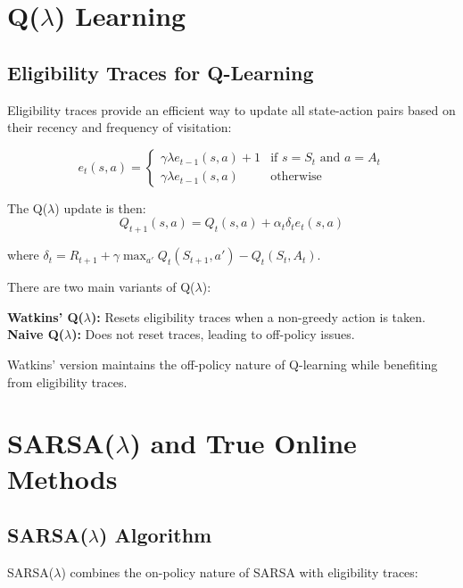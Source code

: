 \section{Q($\lambda$) Learning}

\subsection{Eligibility Traces for Q-Learning}

Eligibility traces provide an efficient way to update all state-action pairs based on their recency and frequency of visitation:

\begin{equation}
e_t(s,a) = \begin{cases}
\gamma \lambda e_{t-1}(s,a) + 1 & \text{if } s = S_t \text{ and } a = A_t \\
\gamma \lambda e_{t-1}(s,a) & \text{otherwise}
\end{cases}
\end{equation}

The Q($\lambda$) update is then:
\begin{equation}
Q_{t+1}(s,a) = Q_t(s,a) + \alpha_t \delta_t e_t(s,a)
\end{equation}

where $\delta_t = R_{t+1} + \gamma \max_{a'} Q_t(S_{t+1}, a') - Q_t(S_t, A_t)$.

\begin{examplebox}
There are two main variants of Q($\lambda$):

\textbf{Watkins' Q($\lambda$):} Resets eligibility traces when a non-greedy action is taken.
\textbf{Naive Q($\lambda$):} Does not reset traces, leading to off-policy issues.

Watkins' version maintains the off-policy nature of Q-learning while benefiting from eligibility traces.
\end{examplebox}

\section{SARSA($\lambda$) and True Online Methods}

\subsection{SARSA($\lambda$) Algorithm}

SARSA($\lambda$) combines the on-policy nature of SARSA with eligibility traces:

